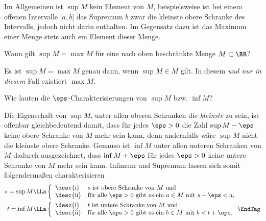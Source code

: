 \begin{antwort}
  Im Allgemeinen ist $\sup M$ kein Element von $M$, 
  beispielsweise ist bei einem offenen Intervalle $]a,b[$ das Supremum 
  $b$ zwar die kleinste obere Schranke des 
  Intervalls, jedoch nicht darin enthalten. 
  Im Gegensatz dazu ist das Maximum einer Menge stets auch ein Element dieser 
  Menge. \AntEnd
\end{antwort} 

\begin{frage}
  Wann gilt $\sup M=\max M$ für eine nach oben 
  beschränkte Menge $M\subset\RR$?
\end{frage}

\begin{antwort}
  Es ist $\sup M =\max M$ genau dann, wenn 
  $\sup M \in M$ gilt. In diesem \textit{und nur in diesem} Fall existiert 
  $\max M$.
  \AntEnd
\end{antwort}


\begin{frage}
  \label{q:sup-eps-charak}
  Wie lauten die $\eps$-Charakterisierungen von $\sup M$ bzw. $\inf M$?
\end{frage}

\begin{antwort}
  Die Eigenschaft 
  von $\sup M$, unter allen oberen Schranken die 
  \textit{kleinste} zu sein, ist offenbar gleichbedeutend 
  damit, dass für jedes $\eps>0$ 
  die Zahl $\sup M-\eps$ keine obere 
  Schranke von $M$ mehr sein kann, denn 
  andernfalls wäre $\sup M$ nicht die kleinste obere Schranke. 
  Genauso ist $\inf M$ unter allen unteren Schranken von $M$ dadurch 
  ausgezeichnet, dass $\inf M+\eps$ für jedes $\eps >0$ 
  keine untere Schranke von $M$ mehr sein kann. Infimum und Supremum lassen 
  sich somit folgendermaßen charakterisieren 
  \begin{align}
    s = \sup M &\LLa \left\{ \begin{array}{ll}
        \text{\desc{i}} &  \text{$s$ ist obere Schranke von $M$ und} \\
        \text{\desc{ii}} & \text{für alle $\eps>0$ gibt es ein $a\in M$ mit $s-\eps<a$},
      \end{array} \right. \notag 
    \\
    t = \inf M &\LLa \left\{ \begin{array}{ll}
        \text{\desc{i}} & \text{$t$ ist untere Schranke von $M$ und} \\
        \text{\desc{ii}} & \text{für alle $\eps>0$ gibt es ein $b\in M$ mit $b<t+\eps$}.
      \end{array} \right. \EndTag
  \end{align}
\end{antwort}

